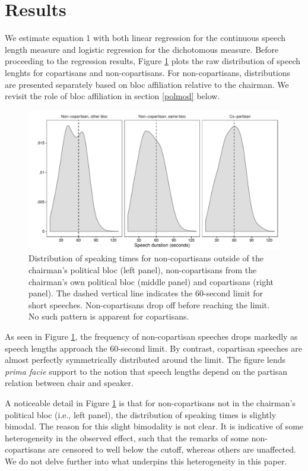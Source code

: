 \documentclass[12pt,a4paper]{article}
\begin{document}
\section{Results}\label{res}

\noindent We estimate equation 1 with both linear regression for the continuous speech length measure and logistic regression for the dichotomous measure. Before proceeding to the regression results, Figure \ref{parlbias_dens} plots the raw distribution of speech lenghts for copartisans and non-copartisans. For non-copartisans, distributions are presented separately based on bloc affiliation relative to the chairman. We revisit the role of bloc affiliation in section \ref{polmod} below.

\begin{figure}[h]
\centering
\includegraphics[scale=.70]{../figures/parlbias_dens}
  \caption{Distribution of speaking times for non-copartisans outside of the chairman's political bloc (left panel), non-copartisans from the chairman's own political bloc (middle panel) and copartisans (right panel). The dashed vertical line indicates the 60-second limit for short speeches. Non-copartisans drop off before reaching the limit. No such pattern is apparent for copartisans.}\label{parlbias_dens}
\end{figure}

As seen in Figure \ref{parlbias_dens}, the frequency of non-copartisan speeches drops markedly as speech lengths approach the 60-second limit. By contrast, copartisan speeches are almost perfectly symmetrically distributed around the limit. The figure lends \textit{prima facie} support to the notion that speech lengths depend on the partisan relation between chair and speaker.

A noticeable detail in Figure \ref{parlbias_dens} is that for non-copartisans not in the chairman's political bloc (i.e., left panel), the distribution of speaking times is slightly bimodal. The reason for this slight bimodality is not clear. It is indicative of some heterogeneity in the observed effect, such that the remarks of some non-copartisans are censored to well below the cutoff, whereas others are unaffected. We do not delve further into what underpins this heterogeneity in this paper.
\end{document}
